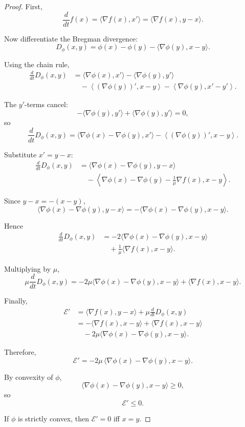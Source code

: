 \documentclass{article}
\theoremstyle{plain}
\theoremstyle{definition}
\theoremstyle{remark}
\begin{document}
\begin{proof}
First,
\[
\frac{d}{dt}f(x)=\langle \nabla f(x),x'\rangle
=\langle \nabla f(x),y-x\rangle .
\]

Now differentiate the Bregman divergence:
\[
D_\phi(x,y)
=\phi(x)-\phi(y)-\langle \nabla\phi(y),x-y\rangle.
\]

Using the chain rule,
\[
\begin{aligned}
\frac{d}{dt}D_\phi(x,y)
&=
\langle \nabla\phi(x),x'\rangle
-\langle \nabla\phi(y),y'\rangle \\
&\quad
-\left\langle (\nabla\phi(y))',x-y\right\rangle
-\left\langle \nabla\phi(y),x'-y'\right\rangle .
\end{aligned}
\]

The \(y'\)-terms cancel:
\[
-\langle \nabla\phi(y),y'\rangle
+\langle \nabla\phi(y),y'\rangle=0,
\]
so
\[
\frac{d}{dt}D_\phi(x,y)
=
\langle \nabla\phi(x)-\nabla\phi(y),x'\rangle
-\left\langle (\nabla\phi(y))',x-y\right\rangle.
\]

Substitute \(x'=y-x\):
\[
\begin{aligned}
\frac{d}{dt}D_\phi(x,y)
&=
\langle \nabla\phi(x)-\nabla\phi(y),y-x\rangle \\
&\quad
-\left\langle
\nabla\phi(x)-\nabla\phi(y)-\frac1\mu\nabla f(x),
x-y
\right\rangle .
\end{aligned}
\]

Since \(y-x=-(x-y)\),
\[
\langle \nabla\phi(x)-\nabla\phi(y),y-x\rangle
=
-\langle \nabla\phi(x)-\nabla\phi(y),x-y\rangle.
\]

Hence
\[
\begin{aligned}
\frac{d}{dt}D_\phi(x,y)
&=
-2\langle \nabla\phi(x)-\nabla\phi(y),x-y\rangle \\
&\quad
+\frac1\mu\langle \nabla f(x),x-y\rangle .
\end{aligned}
\]

Multiplying by \(\mu\),
\[
\mu \frac{d}{dt}D_\phi(x,y)
=
-2\mu \langle \nabla\phi(x)-\nabla\phi(y),x-y\rangle
+\langle \nabla f(x),x-y\rangle .
\]

Finally,
\[
\begin{aligned}
\mathcal{E}'
&=
\langle \nabla f(x),y-x\rangle
+\mu \frac{d}{dt}D_\phi(x,y) \\
&=
-\langle \nabla f(x),x-y\rangle
+\langle \nabla f(x),x-y\rangle \\
&\quad
-2\mu \langle \nabla\phi(x)-\nabla\phi(y),x-y\rangle.
\end{aligned}
\]

Therefore,
\[
\mathcal{E}'
=
-2\mu \,\langle \nabla\phi(x)-\nabla\phi(y),x-y\rangle .
\]

By convexity of \(\phi\),
\[
\langle \nabla\phi(x)-\nabla\phi(y),x-y\rangle \ge 0,
\]
so
\[
\mathcal{E}'\le 0.
\]

If \(\phi\) is strictly convex, then \(\mathcal{E}'=0\) iff \(x=y\).
\end{proof}
\end{document}

